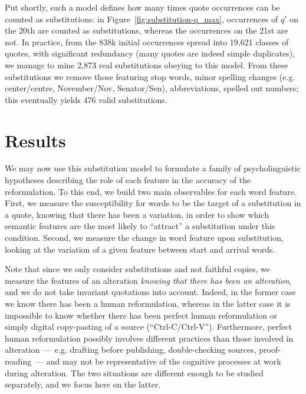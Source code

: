 \medskip
Put shortly, such a model defines how many times quote occurrences can be counted as substitutions: in Figure~\ref{fig:substitution-q_max}, occurrences of $q'$ on the 20th are counted as substitutions, whereas the occurrences on the 21st are not.  In practice, from the 838k initial occurrences spread into 19,621 classes of quotes, with significant redundancy (many quotes are indeed simple duplicates), we manage to mine 2,873 real substitutions obeying to this model. From these substitutions we remove those featuring stop words, minor spelling changes (e.g. center/centre, November/Nov, Senator/Sen), abbreviations, spelled out numbers; this eventually yields 476 valid substitutions. 


\section{Results}\label{sec:results}

We may now use this substitution model to formulate a family of psycholinguistic hypotheses describing the role of each feature in the accuracy of the reformulation.  To this end, we build two main observables for each word feature.  
First, we measure the susceptibility for words to be the target of a substitution in a quote, knowing that there has been a variation, in order to show which semantic features are the most likely to ``attract'' a substitution under this condition. Second, we measure the change in word feature upon substitution, looking at the variation of a given feature between start and arrival words.

Note that since we only consider substitutions and not faithful copies, we measure the features of an alteration \emph{knowing that there has been an alteration}, and we do not take invariant quotations into account.
Indeed, in the former case we know there has been a human reformulation, whereas in the latter case it is impossible to know whether there has been perfect human reformulation or simply digital copy-pasting of a source (``{\sc Ctrl-C}/{\sc Ctrl-V}'').
Furthermore, perfect human reformulation possibly involves different practices than those involved in alteration ---~e.g. drafting before publishing, double-checking sources, proof-reading~--- and may not be representative of the cognitive processes at work during alteration.
The two situations are different enough to be studied separately, and we focus here on the latter.

